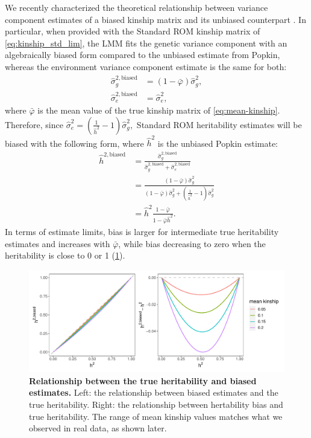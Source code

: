 \documentclass[11pt]{article}
\begin{document}
We recently characterized the theoretical relationship between variance component estimates of a biased kinship matrix and its unbiased counterpart \citep{hou2023genetic}.
In particular, when provided with the Standard ROM kinship matrix of \cref{eq:kinship_std_lim}, the LMM fits the genetic variance component with an algebraically biased form compared to the unbiased estimate from Popkin, whereas the environment variance component estimate is the same for both:
\begin{align*}
  \hat{\sigma}^{2,\text{biased}}_g
  &=
    (1 - \bar{\varphi}) \hat{\sigma}^2_g
    , \\
  \hat{\sigma}^{2,\text{biased}}_e
  &=
    \hat{\sigma}^2_e
    ,
\end{align*}
where $\bar{\varphi}$ is the mean value of the true kinship matrix of \cref{eq:mean-kinship}.
Therefore, since
$
\hat{\sigma}^2_e  
=
\left( \frac{ 1 }{ \hat{h}^2 } - 1 \right) \hat{\sigma}^2_g 
,
$
Standard ROM heritability estimates will be biased with the following form, where $\hat{h}^2$ is the unbiased Popkin estimate:
\begin{align*}
  \hat{h}^{2,\text{biased}}
  &=
    \frac{
    \hat{\sigma}^{2,\text{biased}}_g
    }{
    \hat{\sigma}^{2,\text{biased}}_g + \hat{\sigma}^{2,\text{biased}}_e
    }
  \\
  &=
    \frac{
    (1 - \bar{\varphi}) \hat{\sigma}^2_g
    }{
    (1 - \bar{\varphi}) \hat{\sigma}^2_g
    + \left( \frac{ 1 }{ \hat{h}^2 } - 1 \right) \hat{\sigma}^2_g 
    }
  \\
  &=
    \hat{h}^2
    \frac{
    1 - \bar{\varphi}
    }{
    1 - \bar{\varphi} \hat{h}^2
    }
    .
\end{align*}
In terms of estimate limits, bias is larger for intermediate true heritability estimates and increases with $\bar{\varphi}$, while bias decreasing to zero when the heritability is close to 0 or 1 (\cref{fig:h}).

\begin{figure}[bp!]
  \centering
  \includegraphics[width=\textwidth]{data/Fig_theory.pdf}
  \caption{
    {\bf Relationship between the true heritability and biased estimates.}
    Left: the relationship between biased estimates and the true heritability.
    Right: the relationship between hertability bias and true heritability.
    The range of mean kinship values matches what we observed in real data, as shown later.
    }
  \label{fig:h}
\end{figure}
\end{document}
